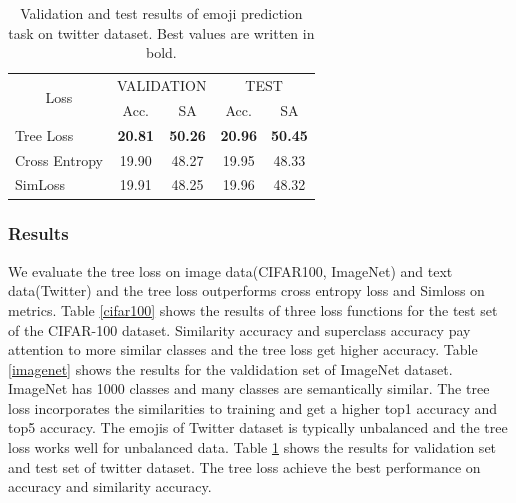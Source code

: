 \documentclass[twoside]{article}
\theoremstyle{definition}
\begin{document}
\begin{table}[h]
\small
\caption{Validation and test results of emoji prediction task on twitter dataset. Best values are written in bold.} \label{twitter}
\begin{center}
\begin{tabular}{@{}lcccc@{}}
\toprule
\multicolumn{1}{c}{\multirow{2}{*}{Loss}} & \multicolumn{2}{c}{VALIDATION} & \multicolumn{2}{c}{TEST}       \\ \cmidrule(l){2-5} 
\multicolumn{1}{c}{}                      & Acc.       & SA       & Acc.      & SA             \\ \cmidrule(r){1-1}
Tree Loss                           &   \textbf{20.81}    &   \textbf{50.26}  &  \textbf{20.96}    &   \textbf{50.45}        \\
Cross Entropy                             &   19.90    &   48.27  &  19.95    &   48.33        \\
SimLoss                                   &   19.91    &   48.25  &  19.96    &   48.32         \\ \bottomrule
\end{tabular}
\end{center}
\end{table}

\subsubsection{Results}
We evaluate the tree loss on image data(CIFAR100, ImageNet) and text data(Twitter) and the tree loss outperforms cross entropy loss and Simloss on metrics.
Table \ref{cifar100} shows the results of three loss functions for the test set of the CIFAR-100 dataset.
Similarity accuracy and superclass accuracy pay attention to more similar classes and the tree loss get higher accuracy.
Table \ref{imagenet} shows the results for the valdidation set of ImageNet dataset.
ImageNet has 1000 classes and many classes are semantically  similar.
The tree loss incorporates the similarities to training and get a higher top1 accuracy and top5 accuracy.
The emojis of Twitter dataset is typically unbalanced and the tree loss works well for unbalanced data.
Table \ref{twitter} shows the results for validation set and test set of twitter dataset.
The tree loss achieve the best performance on accuracy and similarity accuracy.
\end{document}
